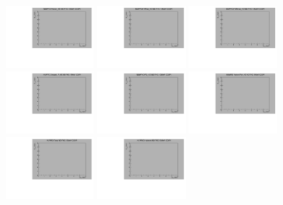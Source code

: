 \begin{center}

  \includegraphics[width=0.245\textwidth]{plots/response_matrix/Proton_KE_FHC_CC0Pi_10MeV.pdf}
  \includegraphics[width=0.245\textwidth]{plots/response_matrix/PiPlus_KE_FHC_CC0Pi_10MeV.pdf}
  \includegraphics[width=0.245\textwidth]{plots/response_matrix/PiMinus_KE_FHC_CC0Pi_10MeV.pdf}
  \includegraphics[width=0.245\textwidth]{plots/response_matrix/Charged_Pi_KE_FHC_CC0Pi_10MeV.pdf}
  \includegraphics[width=0.245\textwidth]{plots/response_matrix/Pi0_KE_FHC_CC0Pi_10MeV.pdf}
  \includegraphics[width=0.245\textwidth]{plots/response_matrix/Proton+Pion_KE_FHC_CC0Pi_10MeV.pdf}
  \includegraphics[width=0.245\textwidth]{plots/response_matrix/Total_FHC_CC0Pi_10MeV.pdf}
  \includegraphics[width=0.245\textwidth]{plots/response_matrix/Hadrons_FHC_CC0Pi_10MeV.pdf}

\end{center}

